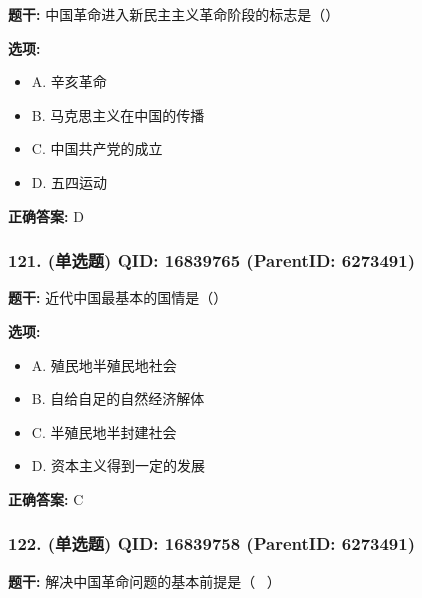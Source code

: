 \documentclass[12pt,UTF8]{ctexart}
\begin{document}
\textbf{题干:}
中国革命进入新民主主义革命阶段的标志是（）



\textbf{选项:}
\begin{itemize}[leftmargin=*]

  \item A. 辛亥革命

  \item B. 马克思主义在中国的传播

  \item C. 中国共产党的成立

  \item D. 五四运动

\end{itemize}

\textbf{正确答案:}
D

\vspace{0.3em}\hrulefill\vspace{0.7em}

\subsubsection*{121. (单选题) \small QID: 16839765 (ParentID: 6273491)}

\textbf{题干:}
近代中国最基本的国情是（）



\textbf{选项:}
\begin{itemize}[leftmargin=*]

  \item A. 殖民地半殖民地社会

  \item B. 自给自足的自然经济解体

  \item C. 半殖民地半封建社会

  \item D. 资本主义得到一定的发展

\end{itemize}

\textbf{正确答案:}
C

\vspace{0.3em}\hrulefill\vspace{0.7em}

\subsubsection*{122. (单选题) \small QID: 16839758 (ParentID: 6273491)}

\textbf{题干:}
解决中国革命问题的基本前提是（  ）
\end{document}
